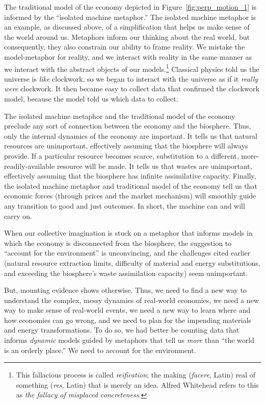 The traditional model of the economy depicted in Figure~\ref{fig:perp_motion_1} 
is informed by the ``isolated machine metaphor.''
The isolated machine metaphor is an example, as discussed above, 
of a simplification that helps us make sense of the world around us.
Metaphors inform our thinking about the real world,
but consequently,
they also constrain our ability to frame reality.
We mistake the model-metaphor for reality, and
we interact with reality in the same manner 
as we interact with the abstract objects of our
models.\footnote{This fallacious process is called
	\emph{reification}; the making (\emph{facere}, Latin) real of
	something (\emph{res}, Latin) that is merely an idea.
	Alfred Whitehead refers to this as
	\emph{the fallacy of misplaced concreteness}.\cite{Whitehead2011}}
Classical physics told us the universe is
\emph{like} clockwork, 
so we began to interact with the universe
as if it \emph{really were} clockwork.
It then became easy to collect data that confirmed the clockwork model,
because the model told us which data to collect.

The isolated machine metaphor and the traditional model of the economy
preclude any sort of connection 
between the economy and the biosphere.
Thus, only the internal dynamics of the economy are important. 
It tells us that natural resources are unimportant, effectively assuming 
that the biosphere will always provide.
If a particular resource becomes scarce, 
substitution to a different, more-readily-available resource will be made.
It tells us that wastes are unimportant, effectively assuming that the biosphere
has infinite assimilative capacity.
Finally, the isolated machine metaphor and traditional model of the economy 
tell us that economic forces 
(through prices and the market mechanism) will smoothly guide any transition
to good and just outcomes.
In short, the machine can and will carry on.

When our collective imagination is stuck on a metaphor that 
informs models in which the economy is disconnected from the biosphere,
the suggestion to ``account for the environment'' is unconvincing, and 
the challenges cited earlier (natural resource extraction limits,
difficulty of material and energy substitutions, and 
exceeding the biosphere's waste assimilation capacity)
seem unimportant. 

But, mounting evidence shows otherwise. 
Thus, we need to find a new way to understand the complex, 
messy dynamics of real-world economies,
we need a new way to make sense of real-world events, 
we need a new way to learn where and how economies can go wrong, and
we need to plan for the impending materials and energy transformations.
To do so, we had better be counting data that informs \emph{dynamic} models
guided by metaphors that tell us \emph{more} than ``the world is an orderly place.''
We need to account for the environment.


